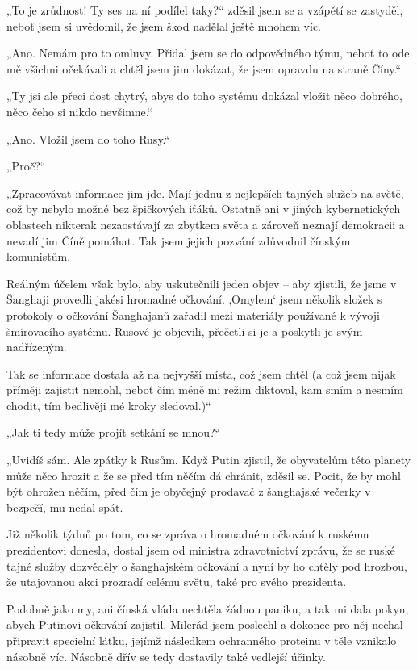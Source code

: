 {„To je zrůdnost! Ty ses na ní podílel taky?“ zděsil jsem se a vzápětí se zastyděl, neboť jsem si uvědomil, že jsem škod nadělal ještě mnohem víc.

„Ano. Nemám pro to omluvy. Přidal jsem se do odpovědného týmu, neboť to ode mě všichni očekávali a chtěl jsem jim dokázat, že jsem opravdu na straně Číny.“

„Ty jsi ale přeci dost chytrý, abys do toho systému dokázal vložit něco dobrého, něco čeho si nikdo nevšimne.“

„Ano. Vložil jsem do toho Rusy.“

„Proč?“

„Zpracovávat informace jim jde. Mají jednu z nejlepších tajných služeb na světě, což by nebylo možné bez špičkových iťáků. Ostatně ani v jiných kybernetických oblastech nikterak nezaostávají za zbytkem světa a zároveň neznají demokracii a nevadí jim Číně pomáhat. Tak jsem jejich pozvání zdůvodnil čínským komunistům.

Reálným účelem však bylo, aby uskutečnili jeden objev – aby zjistili, že jsme v Šanghaji provedli jakési hromadné očkování. ‚Omylem‘ jsem několik složek s protokoly o očkování Šanghajanů zařadil mezi materiály používané k vývoji šmírovacího systému. Rusové je objevili, přečetli si je a poskytli je svým nadřízeným.

Tak se informace dostala až na nejvyšší místa, což jsem chtěl (a což jsem nijak příměji zajistit nemohl, neboť čím méně mi režim diktoval, kam smím a nesmím chodit, tím bedlivěji mé kroky sledoval.)“

„Jak ti tedy může projít setkání se mnou?“

„Uvidíš sám. Ale zpátky k Rusům. Když Putin zjistil, že obyvatelům této planety může něco hrozit a že se před tím něčím dá chránit, zděsil se. Pocit, že by mohl být ohrožen něčím, před čím je obyčejný prodavač z šanghajské večerky v bezpečí, mu nedal spát. 

Již několik týdnů po tom, co se zpráva o hromadném očkování k ruskému prezidentovi donesla, dostal jsem od ministra zdravotnictví zprávu, že se ruské tajné služby dozvěděly o šanghajském očkování a nyní by ho chtěly pod hrozbou, že utajovanou akci prozradí celému světu, také pro svého prezidenta.

Podobně jako my, ani čínská vláda nechtěla žádnou paniku, a tak mi dala pokyn, abych Putinovi očkování zajistil. Milerád jsem poslechl a dokonce pro něj nechal připravit specielní látku, jejímž následkem ochranného proteinu v těle vznikalo násobně víc. Násobně dřív se tedy dostavily také vedlejší účinky.

}
